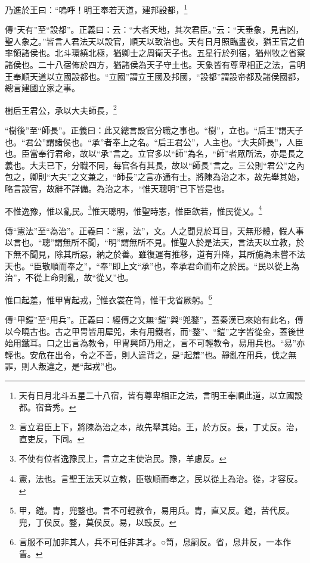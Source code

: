 乃進於王曰：“嗚呼！明王奉若天道，建邦設都，\footnote{天有日月北斗五星二十八宿，皆有尊卑相正之法，言明王奉順此道，以立國設都。宿音秀。}

{\noindent\zhuan{}\fzbyks 傳“天有”至“設都”。正義曰：云：“大者天地，其次君臣。”云：“天垂象，見吉凶，聖人象之。”皆言人君法天以設官，順天以致治也。天有日月照臨晝夜，猶王官之伯率領諸侯也。北斗環繞北極，猶卿士之周衛天子也。五星行於列宿，猶州牧之省察諸侯也。二十八宿佈於四方，猶諸侯為天子守土也。天象皆有尊卑相正之法，言明王奉順天道以立國設都也。“立國”謂立王國及邦國，“設都”謂設帝都及諸侯國都，總言建國立家之事。 \par}

樹后王君公，承以大夫師長，\footnote{言立君臣上下，將陳為治之本，故先舉其始。王，於方反。長，丁丈反。治，直吏反，下同。}

{\noindent\shu{}\fzkt “樹後”至“師長”。正義曰：此又總言設官分職之事也。“樹”，立也。“后王”謂天子也。“君公”謂諸侯也。“承”者奉上之名。“后王君公”，人主也。“大夫師長”，人臣也。臣當奉行君命，故以“承”言之。立官多以“師”為名，“師”者眾所法，亦是長之義也。大夫已下，分職不同，每官各有其長，故以“師長”言之。三公則“君公”之內包之，卿則“大夫”之文兼之，“師長”之言亦通有士。將陳為治之本，故先舉其始，略言設官，故辭不詳備。為治之本，“惟天聰明”已下皆是也。 \par}

不惟逸豫，惟以亂民。\footnote{不使有位者逸豫民上，言立之主使治民。豫，羊慮反。}惟天聰明，惟聖時憲，惟臣欽若，惟民從乂。\footnote{憲，法也。言聖王法天以立教，臣敬順而奉之，民以從上為治。從，才容反。}

{\noindent\zhuan{}\fzbyks 傳“憲法”至“為治”。正義曰：“憲，法”，文。人之聞見於耳目，天無形體，假人事以言也。“聰”謂無所不聞，“明”謂無所不見。惟聖人於是法天，言法天以立教，於下無不聞見，除其所惡，納之於善。雖復運有推移，道有升降，其所施為未嘗不法天也。“臣敬順而奉之”，“奉”即上文“承”也，奉承君命而布之於民。“民以從上為治”，不從上命則亂，故“從乂”也。 \par}

惟口起羞，惟甲冑起戎，\footnote{甲，鎧。胄，兜鍪也。言不可輕教令，易用兵。胄，直又反。鎧，苦代反。兜，丁侯反。鍪，莫侯反。易，以豉反。}惟衣裳在笥，惟干戈省厥躬。\footnote{言服不可加非其人，兵不可任非其才。○笥，息嗣反。省，息井反，一本作眚。}


{\noindent\zhuan{}\fzbyks 傳“甲鎧”至“用兵”。正義曰：經傳之文無“鎧”與“兜鍪”，蓋秦漢已來始有此名，傳以今曉古也。古之甲冑皆用犀兕，未有用鐵者，而“鍪”、“鎧”之字皆從金，蓋後世始用鐵耳。口之出言為教令，甲冑興師乃用之，言不可輕教令，易用兵也。“易”亦輕也。安危在出令，令之不善，則人違背之，是“起羞”也。靜亂在用兵，伐之無罪，則人叛違之，是“起戎”也。 \par}

